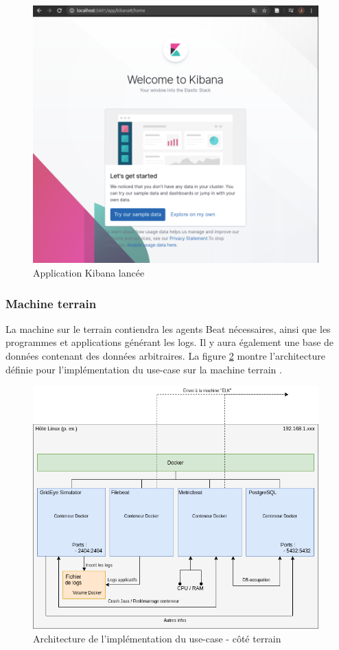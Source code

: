 \documentclass[paper=a4, fontsize=11pt]{scrartcl}
\begin{document}
\begin{figure}[H]
    \centering
    \includegraphics[width=11cm]{img/screenshots/kibana_installed.png}
    \caption{Application Kibana lancée}
    \label{f-kibanaInstalled}
\end{figure}

\subsubsection{Machine \og terrain \fg} \label{ss-machineTerrain}
La machine sur le terrain contiendra les agents Beat nécessaires, ainsi que les programmes et applications générant les logs. Il y aura également une base de données contenant des données arbitraires. La figure \ref{f-dockerFieldTopology} montre l'architecture définie pour l'implémentation du use-case sur la machine \og terrain \fg.

\begin{figure}[H]
    \centering
    \includegraphics[width=11cm]{img/Beat_docker_topology.png}
    \caption{Architecture de l'implémentation du use-case - côté terrain}
    \label{f-dockerFieldTopology}
\end{figure}
\end{document}
